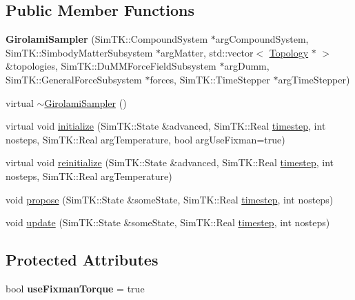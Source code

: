 \subsection*{Public Member Functions}
\begin{DoxyCompactItemize}
\item 
{\bfseries Girolami\+Sampler} (Sim\+T\+K\+::\+Compound\+System $\ast$arg\+Compound\+System, Sim\+T\+K\+::\+Simbody\+Matter\+Subsystem $\ast$arg\+Matter, std\+::vector$<$ \hyperlink{classTopology}{Topology} $\ast$ $>$ \&topologies, Sim\+T\+K\+::\+Du\+M\+M\+Force\+Field\+Subsystem $\ast$arg\+Dumm, Sim\+T\+K\+::\+General\+Force\+Subsystem $\ast$forces, Sim\+T\+K\+::\+Time\+Stepper $\ast$arg\+Time\+Stepper)\hypertarget{classGirolamiSampler_a45a3f2334ac7cf244bab902304be9e3b}{}\label{classGirolamiSampler_a45a3f2334ac7cf244bab902304be9e3b}

\item 
virtual \hyperlink{classGirolamiSampler_afdf9a9d83f383611cdfc4226e76f70f7}{$\sim$\+Girolami\+Sampler} ()
\item 
virtual void \hyperlink{classGirolamiSampler_a1e48f38fa966f7063f190bba32193b42}{initialize} (Sim\+T\+K\+::\+State \&advanced, Sim\+T\+K\+::\+Real \hyperlink{classHMCSampler_a8cd8b25b42e94acb34aa0dea64c67b5b}{timestep}, int nosteps, Sim\+T\+K\+::\+Real arg\+Temperature, bool arg\+Use\+Fixman=true)
\item 
virtual void \hyperlink{classGirolamiSampler_a60a0994ea481381dd2596a711d839f5d}{reinitialize} (Sim\+T\+K\+::\+State \&advanced, Sim\+T\+K\+::\+Real \hyperlink{classHMCSampler_a8cd8b25b42e94acb34aa0dea64c67b5b}{timestep}, int nosteps, Sim\+T\+K\+::\+Real arg\+Temperature)
\item 
void \hyperlink{classGirolamiSampler_ad5b07ddfcab269774723a8156670ee28}{propose} (Sim\+T\+K\+::\+State \&some\+State, Sim\+T\+K\+::\+Real \hyperlink{classHMCSampler_a8cd8b25b42e94acb34aa0dea64c67b5b}{timestep}, int nosteps)
\item 
void \hyperlink{classGirolamiSampler_aef18692e13adaa564a9106e94a801893}{update} (Sim\+T\+K\+::\+State \&some\+State, Sim\+T\+K\+::\+Real \hyperlink{classHMCSampler_a8cd8b25b42e94acb34aa0dea64c67b5b}{timestep}, int nosteps)
\end{DoxyCompactItemize}
\subsection*{Protected Attributes}
\begin{DoxyCompactItemize}
\item 
bool {\bfseries use\+Fixman\+Torque} = true\hypertarget{classGirolamiSampler_a6f81b5defa538906e80690464b7102b6}{}\label{classGirolamiSampler_a6f81b5defa538906e80690464b7102b6}

\end{DoxyCompactItemize}
